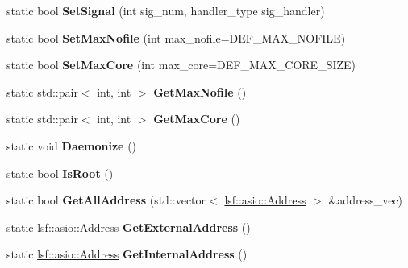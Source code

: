 \begin{DoxyCompactItemize}
\item 
\hypertarget{classlsf_1_1util_1_1System_a302772a58f112e6dfa2177ebd992d52e}{
static bool {\bfseries SetSignal} (int sig\_\-num, handler\_\-type sig\_\-handler)}
\label{classlsf_1_1util_1_1System_a302772a58f112e6dfa2177ebd992d52e}

\item 
\hypertarget{classlsf_1_1util_1_1System_a80d507028831bf939f95f0e8ac5caddd}{
static bool {\bfseries SetMaxNofile} (int max\_\-nofile=DEF\_\-MAX\_\-NOFILE)}
\label{classlsf_1_1util_1_1System_a80d507028831bf939f95f0e8ac5caddd}

\item 
\hypertarget{classlsf_1_1util_1_1System_adc6283bfeccd9110983c3509a550e386}{
static bool {\bfseries SetMaxCore} (int max\_\-core=DEF\_\-MAX\_\-CORE\_\-SIZE)}
\label{classlsf_1_1util_1_1System_adc6283bfeccd9110983c3509a550e386}

\item 
\hypertarget{classlsf_1_1util_1_1System_ab46186f6c6bcb772ac2424b76eda8692}{
static std::pair$<$ int, int $>$ {\bfseries GetMaxNofile} ()}
\label{classlsf_1_1util_1_1System_ab46186f6c6bcb772ac2424b76eda8692}

\item 
\hypertarget{classlsf_1_1util_1_1System_a1eb3fff8ef1543f6901e81ff7f69a384}{
static std::pair$<$ int, int $>$ {\bfseries GetMaxCore} ()}
\label{classlsf_1_1util_1_1System_a1eb3fff8ef1543f6901e81ff7f69a384}

\item 
\hypertarget{classlsf_1_1util_1_1System_af6823b1f0d63945c9a46fb32d235ff38}{
static void {\bfseries Daemonize} ()}
\label{classlsf_1_1util_1_1System_af6823b1f0d63945c9a46fb32d235ff38}

\item 
\hypertarget{classlsf_1_1util_1_1System_a87a1c4edc7a3be2a52685ba4a0cc134b}{
static bool {\bfseries IsRoot} ()}
\label{classlsf_1_1util_1_1System_a87a1c4edc7a3be2a52685ba4a0cc134b}

\item 
\hypertarget{classlsf_1_1util_1_1System_aacee719381f7591cd536126626423931}{
static bool {\bfseries GetAllAddress} (std::vector$<$ \hyperlink{classlsf_1_1asio_1_1Address}{lsf::asio::Address} $>$ \&address\_\-vec)}
\label{classlsf_1_1util_1_1System_aacee719381f7591cd536126626423931}

\item 
\hypertarget{classlsf_1_1util_1_1System_ad7a6f0ad612397903e1a13e5512eb02f}{
static \hyperlink{classlsf_1_1asio_1_1Address}{lsf::asio::Address} {\bfseries GetExternalAddress} ()}
\label{classlsf_1_1util_1_1System_ad7a6f0ad612397903e1a13e5512eb02f}

\item 
\hypertarget{classlsf_1_1util_1_1System_a99a7f985dcabbb7e31855b6252f054ad}{
static \hyperlink{classlsf_1_1asio_1_1Address}{lsf::asio::Address} {\bfseries GetInternalAddress} ()}
\label{classlsf_1_1util_1_1System_a99a7f985dcabbb7e31855b6252f054ad}

\end{DoxyCompactItemize}

